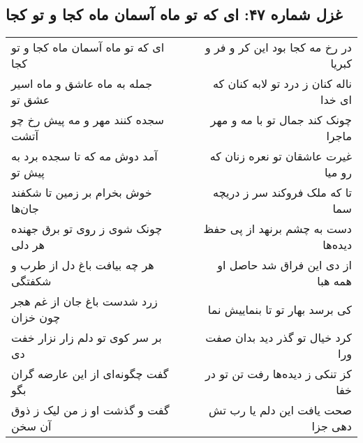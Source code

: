 \begin{center}
\section*{غزل شماره ۴۷: ای که تو ماه آسمان ماه کجا و تو کجا}
\label{sec:0047}
\begin{longtable}{l p{0.5cm} r}
ای که تو ماه آسمان ماه کجا و تو کجا
&&
در رخ مه کجا بود این کر و فر و کبریا
\\
جمله به ماه عاشق و ماه اسیر عشق تو
&&
ناله کنان ز درد تو لابه کنان که ای خدا
\\
سجده کنند مهر و مه پیش رخ چو آتشت
&&
چونک کند جمال تو با مه و مهر ماجرا
\\
آمد دوش مه که تا سجده برد به پیش تو
&&
غیرت عاشقان تو نعره زنان که رو میا
\\
خوش بخرام بر زمین تا شکفند جان‌ها
&&
تا که ملک فروکند سر ز دریچه سما
\\
چونک شوی ز روی تو برق جهنده هر دلی
&&
دست به چشم برنهد از پی حفظ دیده‌ها
\\
هر چه بیافت باغ دل از طرب و شکفتگی
&&
از دی این فراق شد حاصل او همه هبا
\\
زرد شدست باغ جان از غم هجر چون خزان
&&
کی برسد بهار تو تا بنماییش نما
\\
بر سر کوی تو دلم زار نزار خفت دی
&&
کرد خیال تو گذر دید بدان صفت ورا
\\
گفت چگونه‌ای از این عارضه گران بگو
&&
کز تنکی ز دیده‌ها رفت تن تو در خفا
\\
گفت و گذشت او ز من لیک ز ذوق آن سخن
&&
صحت یافت این دلم یا رب تش دهی جزا
\\
\end{longtable}
\end{center}
